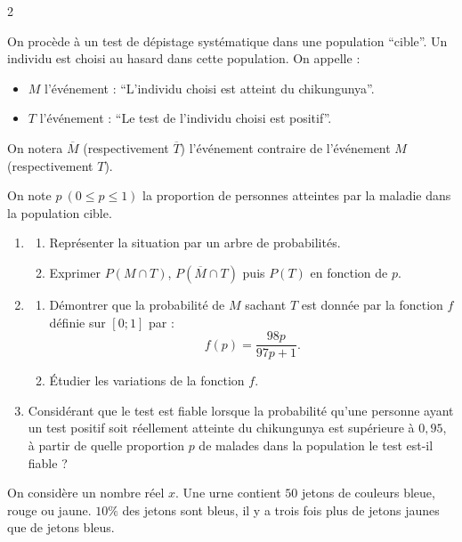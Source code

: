 \documentclass[a4paper,12pt]{article}
\begin{document}
\begin{multicols}{2}
\begin{exercice}[title=Exercice 33 $\quad \star \star \quad$ { [Calculer, Modéliser] }]{}{}
On procède à un test de dépistage systématique dans une population ``cible''. Un individu est choisi au hasard dans cette population. On appelle :
\begin{itemize}[noitemsep, topsep=0pt]
    \item $M$ l’événement : ``L’individu choisi est atteint du chikungunya''.
    \item $T$ l’événement : ``Le test de l’individu choisi est positif''.
\end{itemize}

On notera $\overline{M}$ (respectivement $\overline{T}$) l’événement contraire de l’événement $M$ (respectivement $T$).

On note $p \ (0 \leq p \leq 1)$ la proportion de personnes atteintes par la maladie dans la population cible.
\begin{enumerate}
  \item \begin{enumerate}
    \item Représenter la situation par un arbre de probabilités.
    \item Exprimer $P(M \cap T)$, $P(\overline{M} \cap T)$ puis $P(T)$ en fonction de $p$.
  \end{enumerate}
  \item \begin{enumerate}
    \item Démontrer que la probabilité de $M$ sachant $T$ est donnée par la fonction $f$ définie sur $[0; 1]$ par :
    \[
    f(p) = \dfrac{98p}{97p + 1}.
    \]
    \item Étudier les variations de la fonction $f$.
  \end{enumerate}
  \item Considérant que le test est fiable lorsque la probabilité qu’une personne ayant un test positif soit réellement atteinte du chikungunya est supérieure à $0,95$, à partir de quelle proportion $p$ de malades dans la population le test est-il fiable ?
\end{enumerate}
\end{exercice}

\vfill

\begin{exercice}[title=Exercice 34 $\quad \star \star \star \quad$ { [Calculer, Modéliser, Chercher] }]{}{}
On considère un nombre réel $x$. Une urne contient $50$ jetons de couleurs bleue, rouge ou jaune. $10\%$ des jetons sont bleus, il y a trois fois plus de jetons jaunes que de jetons bleus. 


\end{exercice}
\end{multicols}
\end{document}
